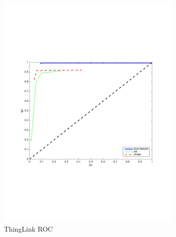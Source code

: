 \documentclass[english,12pt,a4paper,pdftex,elec,utf8, table]{aaltothesis}
\begin{document}
\begin{figure}[htb]
\begin{center}
\begin{subfigure}[b]{0.49\textwidth}
    \includegraphics[width=\textwidth]{figures/thinglink_83scaleROC.pdf}
    \caption{ThingLink ROC}
    \label{83pr}
  \end{subfigure}
  \begin{subfigure}[b]{0.49\textwidth}

\end{subfigure}
\end{center}
\end{figure}
\end{document}
